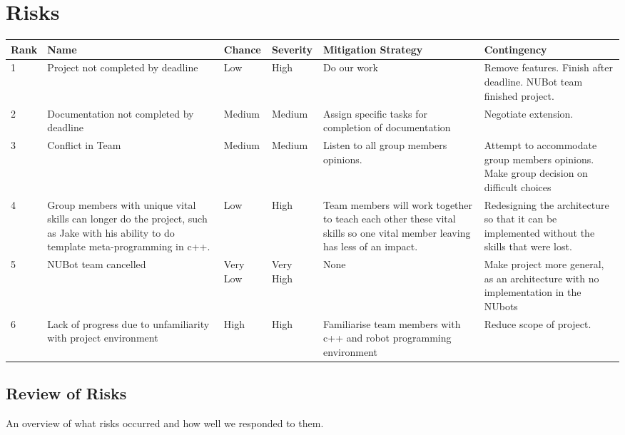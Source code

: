 \documentclass[a4paper]{article}
\begin{document}
	\section{Risks}
		\begin{table}[htbp]
		\begin{tabularx}{\linewidth}{ | m{0.6cm} |  X | m{1.05cm} |  m{1.05cm} |  X | X |}
			\hline 
			Rank & Name & Chance & Severity & Mitigation Strategy & Contingency \\  \hline
			1 & Project not completed by deadline & Low & High & Do our work & Remove features. Finish after deadline. NUBot team finished project. \\ \hline
			2 & Documentation not completed by deadline & Medium & Medium & Assign specific tasks for completion of documentation & Negotiate extension. \\ \hline
			3 & Conflict in Team & Medium & Medium & Listen to all group members opinions. & Attempt to accommodate group members opinions. Make group decision on difficult choices \\ \hline
			4 & Group members with unique vital skills can longer do the project, such as Jake with his ability to do template meta-programming in c++. & Low & High & Team members will work together to teach each other these vital skills so one vital member leaving has less of an impact. & Redesigning the architecture so that it can be implemented without the skills that were lost. \\ \hline
			5 & NUBot team cancelled & Very Low & Very High & None & Make project more general, as an architecture with no implementation in the NUbots \\ \hline
			6 & Lack of progress due to unfamiliarity with project environment & High & High & Familiarise team members with c++ and robot programming environment & Reduce scope of project. \\ \hline
		\end{tabularx}
		\end{table}
		\subsection{Review of Risks}
			An overview of what risks occurred and how well we responded to them.
\end{document}
